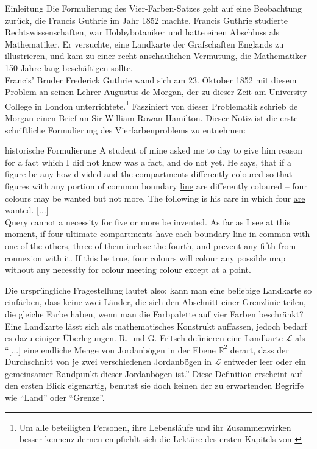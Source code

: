 \begin{chapter}{Einleitung}
 Die Formulierung des Vier-Farben-Satzes geht auf eine Beobachtung zurück, die Francis Guthrie im Jahr 1852 machte. Francis Guthrie studierte Rechtswissenschaften, war Hobbybotaniker und hatte einen Abschluss als Mathematiker. Er versuchte, eine Landkarte der Grafschaften Englands zu illustrieren, und kam zu einer recht anschaulichen Vermutung, die Mathematiker 150 Jahre lang beschäftigen sollte. \\
 Francis' Bruder Frederick Guthrie wand sich am 23. Oktober 1852 mit diesem Problem an seinen Lehrer Augustus de Morgan, der zu dieser Zeit am University College in London unterrichtete.\footnote{Um alle beteiligten Personen, ihre Lebensläufe und ihr Zusammenwirken besser kennenzulernen empfiehlt sich die Lektüre des ersten Kapitels von \cite{fritsch}} Fasziniert von dieser Problematik schrieb de Morgan einen Brief an Sir William Rowan Hamilton. Dieser Notiz ist die erste schriftliche Formulierung des Vierfarbenproblems zu entnehmen:
 
 \begin{satz}{historische Formulierung}
  A student of mine asked me to day to give him reason for a fact which I did not know was a fact, and do not yet. He says, that if a figure be any how divided and the compartments differently coloured so that figures with any portion of common boundary \underline{line} are differently coloured -- four colours may be wanted but not more. The following is his care in which four \underline{are} wanted. [...]\\
  Query cannot a necessity for five or more be invented. As far as I see at this moment, if four \underline{ultimate} compartments have each boundary line in common with one of the others, three of them inclose the fourth, and prevent any fifth from connexion with it. If this be true, four colours will colour any possible map without any necessity for colour meeting colour except at a point. \cite{fritsch}
 \end{satz}
 
 Die ursprüngliche Fragestellung lautet also: kann man eine beliebige Landkarte so einfärben, dass keine zwei Länder, die sich den Abschnitt einer Grenzlinie teilen, die gleiche Farbe haben, wenn man die Farbpalette auf vier Farben beschränkt? Eine Landkarte lässt sich als mathematisches Konstrukt auffassen, jedoch bedarf es dazu einiger Überlegungen. R. und G. Fritsch definieren eine Landkarte $\mathcal{L}$ als ``[...] eine endliche Menge von Jordanbögen in der Ebene $\mathbb{R}^2$ derart, dass der Durchschnitt von je zwei verschiedenen Jordanbögen in $\mathcal{L}$ entweder leer oder ein gemeinsamer Randpunkt dieser Jordanbögen ist.'' \cite{fritsch} Diese Definition erscheint auf den ersten Blick eigenartig, benutzt sie doch keinen der zu erwartenden Begriffe wie ``Land'' oder ``Grenze''. 
 

\end{chapter}
